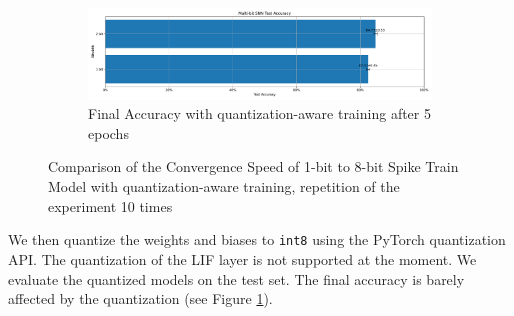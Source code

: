 \begin{figure}[!htpb]
\begin{subfigure}[H]{\textwidth}
                \centering
                \includegraphics[width=\textwidth]{../quantized/FashionMNIST/plots/fashionmnist_final_acc.pdf}
                \caption{Final Accuracy with quantization-aware training after 5 epochs}
                \label{fig:quantization_aware_final_acc}
            \end{subfigure}
            \caption{Comparison of the Convergence Speed of 1-bit to 8-bit Spike Train Model with quantization-aware training, repetition of the experiment 10 times}
            \label{fig:quantization_aware}
        \end{figure}

        We then quantize the weights and biases to \verb|int8| using the PyTorch quantization API. The quantization of the LIF layer is not supported at the moment. We evaluate the quantized models on the test set. The final accuracy is barely affected by the quantization (see Figure \ref{fig:quantization_aware_final_acc}). 